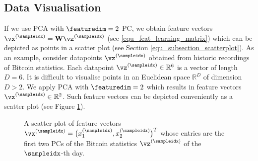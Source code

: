 \documentclass[12pt]{report}
\begin{document}
\subsection{Data Visualisation}

If we use PCA with $\featuredim=2$ PC, we obtain feature vectors 
$\vx^{(\sampleidx)} = \mathbf{W} \vz^{(\sampleidx)}$ (see \eqref{equ_feat_learning_matrix}) 
which can be depicted as points in a scatter plot (see Section \ref{equ_subsection_scatterplot}). 
As an example, consider datapoints $\vz^{(\sampleidx)}$ obtained 
from historic recordings of Bitcoin statistics. Each datapoint $\vz^{(\sampleidx)} \in \mathbb{R}^{6}$ 
is a vector of length $D=6$. It is difficult to visualise points in 
an Euclidean space $\mathbb{R}^{D}$ of dimension $D > 2$. We 
apply PCA with $\featuredim=2$ which results in 
feature vectors $\vx^{(\sampleidx)} \in \mathbb{R}^{2}$. Such feature 
vectors can be depicted conveniently as a scatter plot (see Figure \ref{fig_scatterplot_visualization}). 

\begin{figure}[htbp]
\begin{center}
\end{center}
\caption{A scatter plot of feature vectors $\vx^{(\sampleidx)} = \big(x_{1}^{(\sampleidx)},x_{2}^{(\sampleidx)}\big)^{T}$ 
	whose entries are the first two PCs of the Bitcoin statistics $\vz^{(\sampleidx)}$ of the $\sampleidx$-th day.} 
\label{fig_scatterplot_visualization}
\end{figure}
\end{document}
